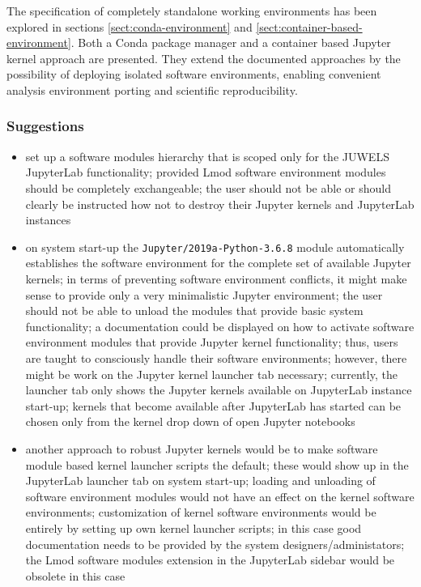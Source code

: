 \documentclass[11pt,a4paper]{article}
\begin{document}
The specification of completely standalone working environments has been explored in sections \ref{sect:conda-environment} and \ref{sect:container-based-environment}.
Both a Conda package manager and a container based Jupyter kernel approach are presented.
They extend the documented approaches by the possibility of deploying isolated software environments, enabling convenient analysis environment porting and scientific reproducibility.

\subsubsection{Suggestions}

\begin{itemize}

  \item set up a software modules hierarchy that is scoped only for the JUWELS JupyterLab functionality;
  provided Lmod software environment modules should be completely exchangeable;
  the user should not be able or should clearly be instructed how not to destroy their Jupyter kernels and JupyterLab instances

  \item on system start-up the \verb|Jupyter/2019a-Python-3.6.8| module automatically establishes the software environment for the complete set of available Jupyter kernels;
  in terms of preventing software environment conflicts, it might make sense to provide only a very minimalistic Jupyter environment;
  the user should not be able to unload the modules that provide basic system functionality;
  a documentation could be displayed on how to activate software environment modules that provide Jupyter kernel functionality;
  thus, users are taught to consciously handle their software environments;
  however, there might be work on the Jupyter kernel launcher tab necessary;
  currently, the launcher tab only shows the Jupyter kernels available on JupyterLab instance start-up;
  kernels that become available after JupyterLab has started can be chosen only from the kernel drop down of open Jupyter notebooks

  \item another approach to robust Jupyter kernels would be to make software module based kernel launcher scripts the default; these would show up in the JupyterLab launcher tab on system start-up; loading and unloading of software environment modules would not have an effect on the kernel software environments; customization of kernel software environments would be entirely by setting up own kernel launcher scripts; in this case good documentation needs to be provided by the system designers/administators; the Lmod software modules extension in the JupyterLab sidebar would be obsolete in this case


\end{itemize}
\end{document}
